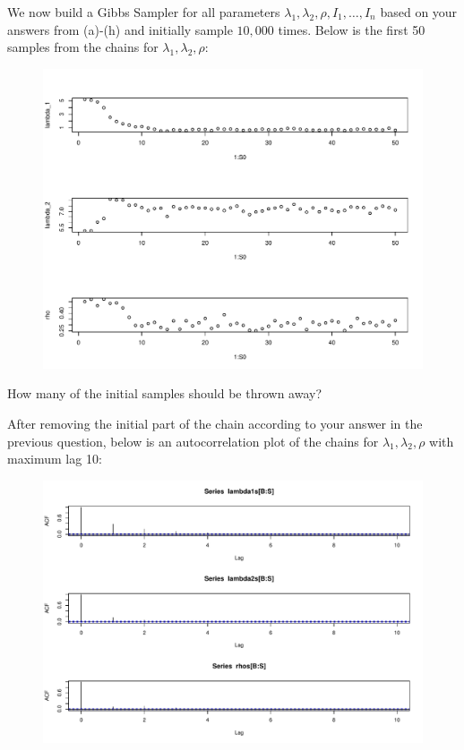 \documentclass[12pt]{article}
\begin{document}
We now build a Gibbs Sampler for all parameters $\lambda_1, \lambda_2, \rho, I_1, \ldots, I_n$ based on your answers from (a)-(h) and initially sample $10,000$ times. Below is the first 50 samples from the chains for $\lambda_1, \lambda_2, \rho$:

\begin{figure}[h]
\centering
\includegraphics[width=7.5in]{burn_in}
\end{figure}
\FloatBarrier

 How many of the initial samples should be thrown away? 

After removing the initial part of the chain according to your answer in the previous question, below is an autocorrelation plot of the chains for $\lambda_1, \lambda_2, \rho$ with maximum lag 10:

\begin{figure}[h]
\centering
\includegraphics[width=7.5in]{acf}
\end{figure}
\FloatBarrier
\end{document}

